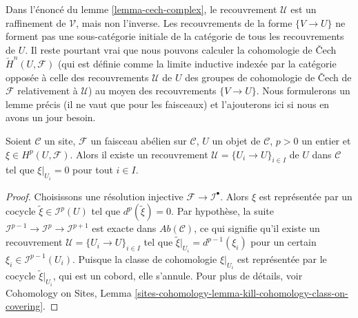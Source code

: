 \begin{remark}
\label{remark-refinement}
Dans l'\'enonc\'e du lemme \ref{lemma-cech-complex}, le recouvrement $\mathcal{U}$
est un raffinement de $\mathcal{V}$, mais non l'inverse. Les recouvrements
de la forme $\{V \to U\}$ ne forment pas une sous-cat\'egorie initiale de la
cat\'egorie de tous les recouvrements de $U$. Il reste pourtant vrai que
nous pouvons calculer la cohomologie de {\v C}ech $\check H^n(U, \mathcal{F})$ (qui
est d\'efinie comme la limite inductive index\'ee par la cat\'egorie oppos\'ee \`a celle des
recouvrements $\mathcal{U}$ de $U$ des groupes de cohomologie de {\v C}ech de
$\mathcal{F}$ relativement \`a $\mathcal{U}$) au moyen des recouvrements
$\{V \to U\}$. Nous formulerons un lemme pr\'ecis (il ne vaut que pour les faisceaux)
et l'ajouterons ici si nous en avons un jour besoin.
\end{remark}

\begin{lemma}
\label{lemma-locality-cohomology}
Soient $\mathcal{C}$ un site, $\mathcal{F}$ un faisceau ab\'elien sur $\mathcal{C}$,
$U$ un objet de $\mathcal{C}$, $p > 0$ un entier et $\xi \in
H^p(U, \mathcal{F})$. Alors il existe un recouvrement
$\mathcal{U} = \{U_i \to U\}_{i \in I}$ de $U$ dans $\mathcal{C}$
tel que $\xi |_{U_i} = 0$ pour tout $i \in I$.
\end{lemma}

\begin{proof}
Choisissons une r\'esolution injective $\mathcal{F} \to \mathcal{I}^\bullet$. Alors
$\xi$ est repr\'esent\'ee par un cocycle $\tilde{\xi} \in \mathcal{I}^p(U)$
tel que $d^p(\tilde{\xi}) = 0$. Par hypoth\`ese, la suite
$\mathcal{I}^{p - 1} \to \mathcal{I}^p \to \mathcal{I}^{p + 1}$ est exacte dans
$\textit{Ab}(\mathcal{C})$, ce qui signifie qu'il existe un recouvrement
$\mathcal{U} = \{U_i \to U\}_{i \in I}$ tel que
$\tilde{\xi}|_{U_i} = d^{p - 1}(\xi_i)$ pour un certain
$\xi_i \in \mathcal{I}^{p-1}(U_i)$. Puisque
la classe de cohomologie $\xi|_{U_i}$ est repr\'esent\'ee par le cocycle
$\tilde{\xi}|_{U_i}$, qui est un cobord, elle s'annule.
Pour plus de d\'etails, voir
Cohomology on Sites,
Lemma \ref{sites-cohomology-lemma-kill-cohomology-class-on-covering}.
\end{proof}

